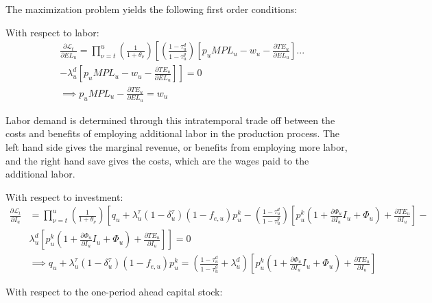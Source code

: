 The maximization problem yields the following first order conditions:

With respect to labor:
\begin{equation}
\label{eqn:foc_l}
\begin{split}
&\frac{\partial \mathcal{L}_{t}}{\partial EL_{u}} = \prod_{\nu=t}^{u}\left(\frac{1}{1+\theta_{\nu}}\right)\left[ \left(\frac{1-\tau^{d}_{u}}{1-\tau^{g}_{u}}\right)\left[p_{u}MPL_{u} - w_{u} - \frac{\partial TE_{u}}{\partial EL_{u}}\right] ... \right. \\
& \left. - \lambda^{d}_{u}\left[p_{u}MPL_{u} - w_{u} - \frac{\partial TE_{u}}{\partial EL_{u}}\right] \right] = 0  \\
& \implies  p_{u}MPL_{u}- \frac{\partial TE_{u}}{\partial EL_{u}} = w_{u}
\end{split}
\end{equation}

Labor demand is determined through this intratemporal trade off between the costs and benefits of employing additional labor in the production process. The left hand side gives the marginal revenue, or benefits from employing more labor, and the right hand save gives the costs, which are the wages paid to the additional labor.

With respect to investment:
 \begin{equation}
\label{eqn:foc_i}
\begin{split}
\frac{\partial \mathcal{L}_{t}}{\partial I_{u}} & =  \prod_{\nu=t}^{u}\left(\frac{1}{1+\theta_{\nu}}\right) \left[ q_{u} + \lambda^{\tau}_{u}(1-\delta^{\tau}_{u})(1-f_{e,u})p^{k}_{u} -  \left(\frac{1-\tau^{d}_{u}}{1-\tau^{g}_{u}}\right) \left[p^{k}_{u}(1+ \frac{\partial \Phi_{u}}{\partial I_{u}}I_{u} + \Phi_{u}) + \frac{\partial TE_{u}}{\partial I_{u}} \right] - \right. \\
& \left. \lambda^{d}_{u}\left[p^{k}_{u}(1+ \frac{\partial \Phi_{u}}{\partial I_{u}}I_{u} + \Phi_{u}) + \frac{\partial TE_{u}}{\partial I_{u}} \right]\right]= 0 \\
& \implies q_{u} + \lambda^{\tau}_{u}(1-\delta^{\tau}_{u})(1-f_{e,u})p^{k}_{u} =  \left(\frac{1-\tau^{d}_{u}}{1-\tau^{g}_{u}} + \lambda^{d}_{u}\right)\left[p^{k}_{u}(1+ \frac{\partial \Phi_{u}}{\partial I_{u}}I_{u} + \Phi_{u}) + \frac{\partial TE_{u}}{\partial I_{u}}\right]
\end{split}
\end{equation}

With respect to the one-period ahead capital stock:

